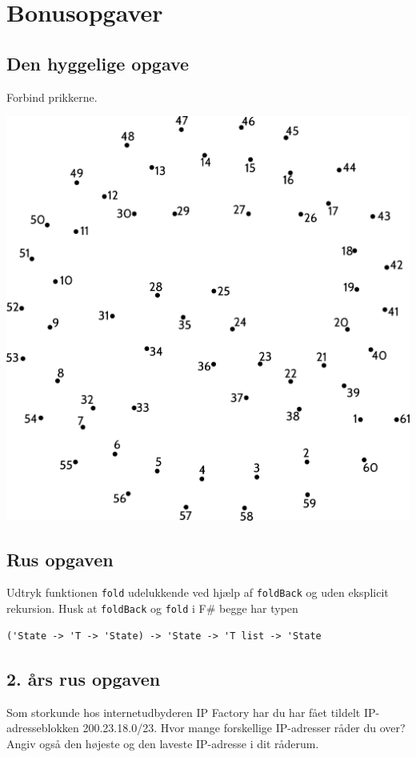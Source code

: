 \section{\huge{Bonusopgaver}}

\subsection{Den hyggelige opgave}

Forbind prikkerne.

\begin{center}
\includegraphics[width=.99\textwidth]{forbind-prikkerne.pdf}
\end{center}


\newpage
\subsection{Rus opgaven}
Udtryk funktionen \texttt{fold} udelukkende ved hjælp af
\texttt{foldBack} og uden eksplicit rekursion.
Husk at \texttt{foldBack} og \texttt{fold} i F\# begge har typen
\begin{verbatim}
('State -> 'T -> 'State) -> 'State -> 'T list -> 'State
\end{verbatim}

\subsection{2. års rus opgaven}
Som storkunde hos internetudbyderen IP Factory har du har fået tildelt IP-adresseblokken 200.23.18.0/23.
Hvor mange forskellige IP-adresser råder du over? Angiv også den højeste og den laveste IP-adresse i dit råderum.

